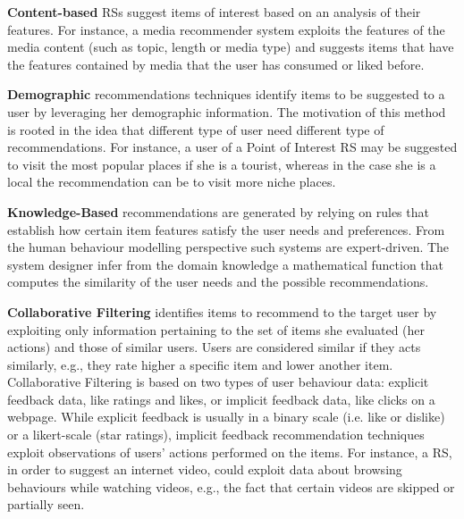\noindent\textbf{Content-based} RSs \cite{contentbased:lops} suggest items of interest based on an analysis of their features. For instance, a media recommender system 
exploits the features of the media content (such as topic, length or media 
type) and suggests items that have the features contained by media that 
the user has consumed or liked before. \newline

\noindent\textbf{Demographic} recommendations techniques \cite{demographic:RSdef} identify items to be suggested to a user by leveraging her demographic information. The motivation of this method is rooted in the idea that different type of user need different type of recommendations. For instance, a user of a Point of Interest RS may be suggested to visit the most popular places if she is a tourist, whereas in the case she is a local the recommendation can be to visit more niche places.\newline

\noindent\textbf{Knowledge-Based} recommendations \cite{kb:RSdef} are generated by relying on rules that establish how certain item features satisfy the user needs and preferences. From the human behaviour modelling perspective such systems are expert-driven. The system designer infer from the domain knowledge a mathematical function that computes the similarity of the user needs and the possible recommendations. \newline

\noindent\textbf{Collaborative Filtering} \cite{cf:koren} identifies items to recommend to the target user by exploiting only information pertaining to the set of items she evaluated (her actions) and those of similar users. 
Users are considered similar if they acts similarly, e.g., they rate higher a specific item and lower another item. Collaborative Filtering is based on two types of user behaviour data: explicit feedback data, like ratings and likes, or implicit feedback data, like clicks on a webpage.  While explicit feedback is usually in a binary scale (i.e. like or dislike) or a likert-scale (star ratings), implicit feedback \cite{Hu2008,Pan2008,gurabnov:2016} recommendation techniques exploit observations of users' actions performed on the items. For instance, a RS, in order to suggest an internet video, could exploit data about browsing behaviours while watching videos, e.g., the fact that certain videos are skipped or partially seen.\newline

